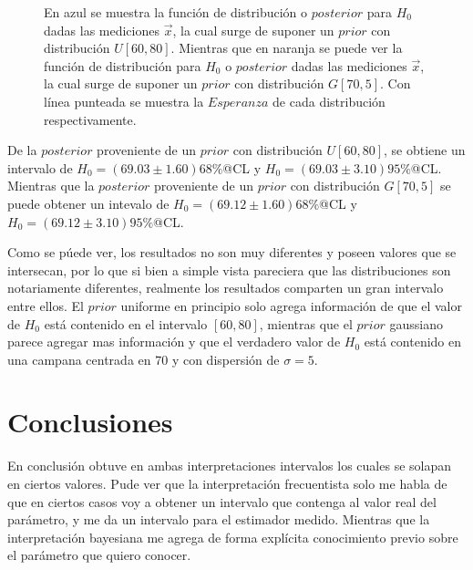 \documentclass[]{article}
\begin{document}
\begin{figure}[H]
    \centering
    \captionsetup{justification=centering}
    \captionsetup{font=footnotesize}
    \caption{En azul se muestra la función de distribución o $posterior$ para $H_0$ dadas las mediciones $\vec{x}$, la cual surge de suponer un $prior$ con distribución 
    $U\left[60, 80\right]$. Mientras que en naranja se puede ver la función de distribución para $H_0$ o $posterior$ dadas las mediciones $\vec{x}$, la cual surge de suponer
    un $prior$ con distribución $G\left[70, 5\right]$. Con línea punteada se muestra la $Esperanza$ de cada distribución respectivamente.}
    \label{fig: intervalo_bayes}
\end{figure}

De la $posterior$ proveniente de un $prior$ con distribución $U \left[60, 80\right]$, se obtiene un intervalo de $H_0 = \left(69.03 \pm 1.60\right)68\%$@CL y
$H_0 = \left(69.03 \pm 3.10\right)95\%$@CL. Mientras que la $posterior$ proveniente de un $prior$ con distribución $G\left[70, 5\right]$ se puede obtener un intevalo
de $H_0 = \left(69.12 \pm 1.60\right)68\%$@CL y $H_0 = \left(69.12 \pm 3.10\right)95\%$@CL. 

Como se púede ver, los resultados no son muy diferentes y poseen valores que se intersecan, por lo que si bien a simple vista pareciera que las distribuciones son notariamente diferentes, 
realmente los resultados comparten un gran intervalo entre ellos. El $prior$ uniforme en principio solo agrega información de que el valor de $H_0$ está contenido en el intervalo 
$\left[60, 80\right]$, mientras que el $prior$ gaussiano parece agregar mas información y que el verdadero valor de $H_0$ está contenido en una campana centrada en $70$ y con 
dispersión de $\sigma = 5$.

\section*{Conclusiones}
En conclusión obtuve en ambas interpretaciones intervalos los cuales se solapan en ciertos valores. Pude ver que la interpretación frecuentista solo me habla de que en ciertos casos voy a obtener
un intervalo que contenga al valor real del parámetro, y me da un intervalo para el estimador medido. Mientras que la interpretación bayesiana me agrega de forma explícita conocimiento 
previo sobre el parámetro que quiero conocer.
\end{document}
